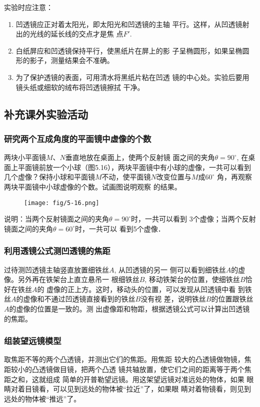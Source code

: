实验时应注意：
\begin{enumerate}
    \item 凹透镜应正对着太阳光，即太阳光和凹透镜的主轴
平行。这样，从凹透镜射出的光线的延长线的交点才是焦
点$F'$.
\item 白纸屏应和凹透镜保持平行，使黑纸片在屏上的影
子呈椭圆形，如果呈椭圆形的影子，测量结果会不准确。
\item 为了保护透镜的表面，可用清水将黑纸片粘在凹透
镜的中心处。实验后要用镜头纸或细软的绒布将凹透镜擦拭
干净。
\end{enumerate}

\subsection{补充课外实验活动}
\subsubsection{研究两个互成角度的平面镜中虚像的个数}
两块小平面镜$M$、$N$垂直地放在桌面上，使两个反射镜
面之间的夹角$\theta=90^{\circ}$, 在桌面上平面镜前放一个小球（图5.16），两块平面镜中有小球的虚像，一共可以看到几个虚像？保持小球和平面镜$M$不动，使平面镜$N$改变位置与$M$成$60^{\circ}$
角，再观察两块平面镜中小球虚像的个数。试画图说明观察
的结果。
\begin{figure}[htp]
    \centering
    \texttt{[image: fig/5-16.png]}
    \caption{}
\end{figure}

说明：当两个反射镜面之间的夹角$\theta=90^{\circ}$时，一共可以看到
3个虚像；当两个反射镜面之间的夹角$\theta=60^{\circ}$时，一共可以
看到5个虚像．

\subsubsection{利用透镜公式测凹透镜的焦距}
过待测凹透镜主轴竖直放置细铁丝$A$, 从凹透镜的另一
侧可以看到细铁丝$A$的虚像。另外再在铁架台上直立悬吊一
根细铁丝$B$, 移动铁架台的位置，使细铁丝$B$恰好在铁丝$A$的
虚像的正上方。这时，移动头的位置，可以发现从凹透镜中看
到铁丝$A$的虚像和不通过凹透镜直接看到的铁丝$B$没有视
差，说明铁丝$B$的位置跟铁丝$A$的虚像的位置是一致的。测
出虚像距和物距，根据透镜公式可以计算出凹透镜的焦距。

\subsubsection{组装望远镜模型}
取焦距不等的两个凸透镜，并测出它们的焦距。用焦距
较大的凸透镜做物镜，焦距较小的凸透镜做目镜，把两个凸透
镜共轴放置，使它们之间的距离等于两个焦距之和，这就组成
简单的开普勒望远镜。用这架望远镜对准远处的物体，如果
眼睛对着目镜看，可以见到远处的物体被“拉近”了，如果眼
睛对着物镜看，则见到远处的物体被“推远”了。

